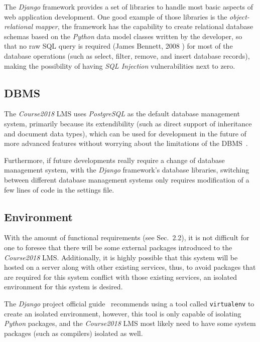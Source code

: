 The \emph{Django} framework provides a set of libraries to handle most basic
aspects of web application development. One good example of those libraries is
the \emph{object-relational mapper}, the framework has the capability to create
relational database schemas based on the \emph{Python} data model classes
written by the developer, so that no raw SQL query is required
(James Bennett, 2008 \cite{django}) for most of the
database operations (such as select, filter, remove, and insert database
records),
making the possibility of having \emph{SQL Injection} vulnerabilities next
to zero.

\subsection{DBMS}
The \emph{Course2018} LMS uses \emph{PostgreSQL} as the default database
management system, primarily because its extendibility (such as direct
support of inheritance and document data types), which can be used for
development in the future of more advanced features without worrying about the
limitations of the DBMS~\cite{postgres}.

\medskip

Furthermore, if future developments really require a change of database
management system,
with the \emph{Django} framework's database libraries,
switching between different database management systems only requires
modification of a few lines of code in the settings file.

\subsection{Environment}
With the amount of functional requirements (see Sec.~2.2), it is not difficult for
one to foresee that there will be some external packages introduced to the
\emph{Course2018} LMS.
Additionally, it is highly possible that this system will be hosted
on a server along with other existing services, thus, to avoid packages that
are required for this system conflict with those existing services, an
isolated environment for this system is desired.

\medskip
The \emph{Django} project official guide~\cite{djangoGuide} recommends using
a tool called \texttt{virtualenv} to create an isolated environment, however,
this tool is only capable of isolating \emph{Python} packages, and the
\emph{Course2018} LMS most likely need to have some system packages (such as
compilers) isolated as well.

